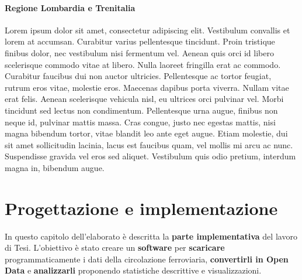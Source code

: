 \documentclass[12pt,italian]{report}
\begin{document}
\subsubsection{Regione Lombardia e Trenitalia}


Lorem ipsum dolor sit amet, consectetur adipiscing elit. Vestibulum
convallis et lorem at accumsan. Curabitur varius pellentesque
tincidunt. Proin tristique finibus dolor, nec vestibulum nisi
fermentum vel. Aenean quis orci id libero scelerisque commodo vitae at
libero. Nulla laoreet fringilla erat ac commodo. Curabitur faucibus
dui non auctor ultricies. Pellentesque ac tortor feugiat, rutrum eros
vitae, molestie eros. Maecenas dapibus porta viverra. Nullam vitae
erat felis. Aenean scelerisque vehicula nisl, eu ultrices orci
pulvinar vel. Morbi tincidunt sed lectus non condimentum. Pellentesque
urna augue, finibus non neque id, pulvinar mattis massa. Cras congue,
justo nec egestas mattis, nisi magna bibendum tortor, vitae blandit
leo ante eget augue. Etiam molestie, dui sit amet sollicitudin
lacinia, lacus est faucibus quam, vel mollis mi arcu ac
nunc. Suspendisse gravida vel eros sed aliquet. Vestibulum quis odio
pretium, interdum magna in, bibendum augue.

\chapter{Progettazione e implementazione}

In questo capitolo dell'elaborato è descritta la \textbf{parte
    implementativa} del lavoro di Tesi.  L'obiettivo è stato creare un
\textbf{software} per \textbf{scaricare} programmaticamente i dati
della circolazione ferroviaria, \textbf{convertirli in Open Data} e
\textbf{analizzarli} proponendo statistiche descrittive e
visualizzazioni.
\end{document}
